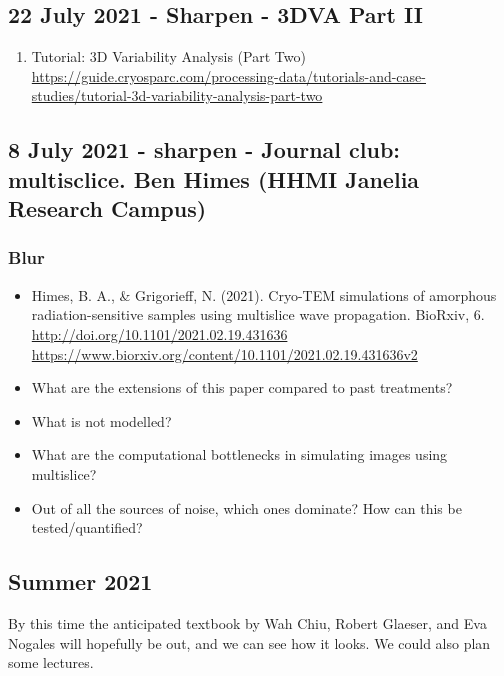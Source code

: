 \documentclass[11pt, oneside]{article}   	%
\begin{document}
\subsection{22 July 2021 - Sharpen - 3DVA Part II}
\begin{enumerate}
	\item Tutorial: 3D Variability Analysis (Part Two) \url{https://guide.cryosparc.com/processing-data/tutorials-and-case-studies/tutorial-3d-variability-analysis-part-two}
\end{enumerate}

\subsection{8 July 2021 - sharpen - Journal club: multisclice. Ben Himes (HHMI Janelia Research Campus)}
\subsubsection{Blur}
\begin{itemize}
	\item Himes, B. A., \& Grigorieff, N. (2021). Cryo-TEM simulations of amorphous radiation-sensitive samples using multislice wave propagation. BioRxiv, 6. \url{http://doi.org/10.1101/2021.02.19.431636} \url{https://www.biorxiv.org/content/10.1101/2021.02.19.431636v2}
\end{itemize}
\begin{itemize}
	\item What are the extensions of this paper compared to past treatments?
	\item What is not modelled?
	\item What are the computational bottlenecks in simulating images using multislice?
	\item Out of all the sources of noise, which ones dominate? How can this be tested/quantified?
\end{itemize}

\subsection{Summer 2021}
By this time the anticipated textbook by Wah Chiu, Robert Glaeser, and Eva Nogales will hopefully be out, and we can see how it looks. We could also plan some lectures.
\end{document}
